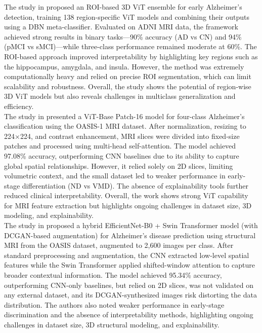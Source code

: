 The study in \cite{saoud2024explainable} proposed an ROI-based 3D ViT ensemble for early Alzheimer’s detection, training 138 region-specific ViT models and combining their outputs using a DBN meta-classifier. Evaluated on ADNI MRI data, the framework achieved strong results in binary tasks—90\% accuracy (AD vs CN) and 94\% (pMCI vs sMCI)—while three-class performance remained moderate at 60\%. The ROI-based approach improved interpretability by highlighting key regions such as the hippocampus, amygdala, and insula. However, the method was extremely computationally heavy and relied on precise ROI segmentation, which can limit scalability and robustness. Overall, the study shows the potential of region-wise 3D ViT models but also reveals challenges in multiclass generalization and efficiency.\\

The study in \cite{mora2023classification} presented a ViT-Base Patch-16 model for four-class Alzheimer’s classification using the OASIS-1 MRI dataset. After normalization, resizing to 224×224, and contrast enhancement, MRI slices were divided into fixed-size patches and processed using multi-head self-attention. The model achieved 97.08\% accuracy, outperforming CNN baselines due to its ability to capture global spatial relationships. However, it relied solely on 2D slices, limiting volumetric context, and the small dataset led to weaker performance in early-stage differentiation (ND vs VMD). The absence of explainability tools further reduced clinical interpretability. Overall, the work shows strong ViT capability for MRI feature extraction but highlights ongoing challenges in dataset size, 3D modeling, and explainability.\\

The study in \cite{velu2025design} proposed a hybrid EfficientNet-B0 + Swin Transformer model (with DCGAN-based augmentation) for Alzheimer's disease prediction using structural MRI from the OASIS dataset, augmented to 2{,}600 images per class. After standard preprocessing and augmentation, the CNN extracted low-level spatial features while the Swin Transformer applied shifted-window attention to capture broader contextual information. The model achieved 95.34\% accuracy, outperforming CNN-only baselines, but relied on 2D slices, was not validated on any external dataset, and its DCGAN-synthesized images risk distorting the data distribution. The authors also noted weaker performance in early-stage discrimination and the absence of interpretability methods, highlighting ongoing challenges in dataset size, 3D structural modeling, and explainability.


